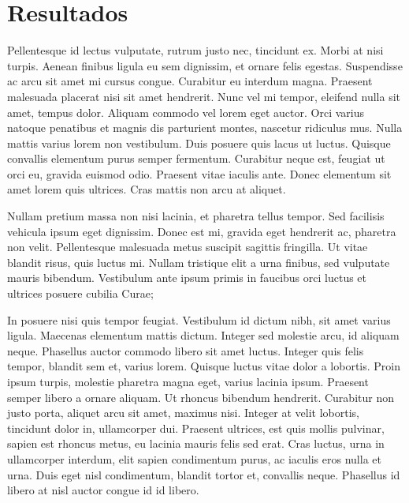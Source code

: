 \section{Resultados}


Pellentesque id lectus vulputate, rutrum justo nec, tincidunt ex. Morbi at nisi turpis. Aenean finibus ligula eu sem dignissim, et ornare felis egestas. Suspendisse ac arcu sit amet mi cursus congue. Curabitur eu interdum magna. Praesent malesuada placerat nisi sit amet hendrerit. Nunc vel mi tempor, eleifend nulla sit amet, tempus dolor. Aliquam commodo vel lorem eget auctor. Orci varius natoque penatibus et magnis dis parturient montes, nascetur ridiculus mus. Nulla mattis varius lorem non vestibulum. Duis posuere quis lacus ut luctus. Quisque convallis elementum purus semper fermentum. Curabitur neque est, feugiat ut orci eu, gravida euismod odio. Praesent vitae iaculis ante. Donec elementum sit amet lorem quis ultrices. Cras mattis non arcu at aliquet.

Nullam pretium massa non nisi lacinia, et pharetra tellus tempor. Sed facilisis vehicula ipsum eget dignissim. Donec est mi, gravida eget hendrerit ac, pharetra non velit. Pellentesque malesuada metus suscipit sagittis fringilla. Ut vitae blandit risus, quis luctus mi. Nullam tristique elit a urna finibus, sed vulputate mauris bibendum. Vestibulum ante ipsum primis in faucibus orci luctus et ultrices posuere cubilia Curae;

In posuere nisi quis tempor feugiat. Vestibulum id dictum nibh, sit amet varius ligula. Maecenas elementum mattis dictum. Integer sed molestie arcu, id aliquam neque. Phasellus auctor commodo libero sit amet luctus. Integer quis felis tempor, blandit sem et, varius lorem. Quisque luctus vitae dolor a lobortis. Proin ipsum turpis, molestie pharetra magna eget, varius lacinia ipsum. Praesent semper libero a ornare aliquam. Ut rhoncus bibendum hendrerit. Curabitur non justo porta, aliquet arcu sit amet, maximus nisi. Integer at velit lobortis, tincidunt dolor in, ullamcorper dui. Praesent ultrices, est quis mollis pulvinar, sapien est rhoncus metus, eu lacinia mauris felis sed erat. Cras luctus, urna in ullamcorper interdum, elit sapien condimentum purus, ac iaculis eros nulla et urna. Duis eget nisl condimentum, blandit tortor et, convallis neque. Phasellus id libero at nisl auctor congue id id libero. 
